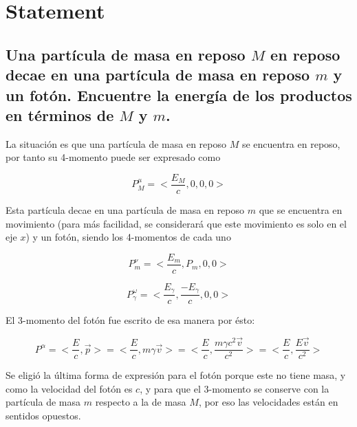 \documentclass{FR16}
\begin{document}
\maketitle


\newpage

\section*{Statement}
\subsection*{Una part\'icula de masa en reposo $M$ en reposo decae en una part\'icula de masa en reposo $m$ y un fot\'on. Encuentre la energ\'ia de los productos en t\'erminos de $M$ y $m$.}

La situaci\'on es que una part\'icula de masa en reposo $M$ se encuentra en reposo, por tanto su 4-momento puede ser expresado como

\begin{equation}
    P^\mu_M = <\frac{E_M}{c}, 0, 0, 0> 
\end{equation}

Esta part\'icula decae en una part\'icula de masa en reposo $m$ que se encuentra en movimiento (para m\'as facilidad, se considerar\'a que este movimiento es solo en el eje $x$) y un fot\'on, siendo los 4-momentos de cada uno

\begin{equation}
    P^\nu_m = <\frac{E_m}{c}, P_m, 0, 0>
\end{equation}

\begin{equation}
    P^\omega_\gamma = <\frac{E_\gamma}{c}, \frac{-E_\gamma}{c}, 0, 0>
\end{equation}

El 3-momento del fot\'on fue escrito de esa manera por \'esto:

\begin{equation*}
    P^\alpha = <\frac{E}{c}, \Vec{p}> = <\frac{E}{c}, m\gamma \Vec{v}> = <\frac{E}{c}, \frac{m\gamma c^2\Vec{v}}{c^2}> = <\frac{E}{c}, \frac{E \Vec{v}}{c^2}>
\end{equation*}

Se eligi\'o la \'ultima forma de expresi\'on para el fot\'on porque este no tiene masa, y como la velocidad del fot\'on es $c$, y para que el 3-momento se conserve con la part\'icula de masa $m$ respecto a la de masa $M$, por eso las velocidades est\'an en sentidos opuestos.
\end{document}
